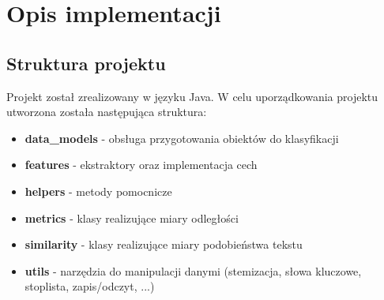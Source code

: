 \documentclass{classrep}
\begin{document}

\section{Opis implementacji}
\subsection{Struktura projektu}
Projekt został zrealizowany w języku Java. W celu uporządkowania projektu utworzona została następująca struktura:
\begin{itemize}
    \item \textbf{data\_models} - obsługa przygotowania obiektów do klasyfikacji
    \item \textbf{features} - ekstraktory oraz implementacja cech
    \item \textbf{helpers} - metody pomocnicze
    \item \textbf{metrics} - klasy realizujące miary odległości
    \item \textbf{similarity} - klasy realizujące miary podobieństwa tekstu
    \item \textbf{utils} - narzędzia do manipulacji danymi (stemizacja, słowa kluczowe, stoplista, zapis/odczyt, ...)
\end{itemize}
\end{document}
